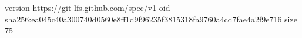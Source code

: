 version https://git-lfs.github.com/spec/v1
oid sha256:ea045c40a300740d0560e8ff1d9f96235f3815318fa9760a4cd7fae4a2f9e716
size 75

